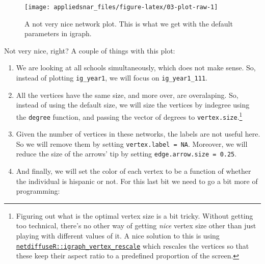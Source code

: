 \documentclass[]{book}
\newenvironment{Shaded}{\begin{snugshade}}{\end{snugshade}}
\newcommand{\KeywordTok}[1]{\textcolor[rgb]{0.13,0.29,0.53}{\textbf{#1}}}
\newcommand{\DecValTok}[1]{\textcolor[rgb]{0.00,0.00,0.81}{#1}}
\newcommand{\StringTok}[1]{\textcolor[rgb]{0.31,0.60,0.02}{#1}}
\newcommand{\OperatorTok}[1]{\textcolor[rgb]{0.81,0.36,0.00}{\textbf{#1}}}
\newcommand{\NormalTok}[1]{#1}
\let\rmarkdownfootnote\footnote%
\def\footnote{\protect\rmarkdownfootnote}
\theoremstyle{definition}
\theoremstyle{definition}
\theoremstyle{definition}
\theoremstyle{remark}
\begin{document}
\begin{figure}

{\centering \texttt{[image: appliedsnar\_files/figure-latex/03-plot-raw-1]} 

}

\caption{A not very nice network plot. This is what we get with the default parameters in igraph.}\label{fig:03-plot-raw}
\end{figure}

Not very nice, right? A couple of things with this plot:

\begin{enumerate}
\def\labelenumi{\arabic{enumi}.}
\item
  We are looking at all schools simultaneously, which does not make
  sense. So, instead of plotting \texttt{ig\_year1}, we will focus on
  \texttt{ig\_year1\_111}.
\item
  All the vertices have the same size, and more over, are overalaping.
  So, instead of using the default size, we will size the vertices by
  indegree using the \texttt{degree} function, and passing the vector of
  degrees to \texttt{vertex.size}.\footnote{Figuring out what is the
    optimal vertex size is a bit tricky. Without getting too technical,
    there's no other way of getting \emph{nice} vertex size other than
    just playing with different values of it. A nice solution to this is
    using
    \href{https://www.rdocumentation.org/packages/netdiffuseR/versions/1.17.0/topics/rescale_vertex_igraph}{\texttt{netdiffuseR::igraph\_vertex\_rescale}}
    which rescales the vertices so that these keep their aspect ratio to
    a predefined proportion of the screen.}
\item
  Given the number of vertices in these networks, the labels are not
  useful here. So we will remove them by setting
  \texttt{vertex.label\ =\ NA}. Moreover, we will reduce the size of the
  arrows' tip by setting \texttt{edge.arrow.size\ =\ 0.25}.
\item
  And finally, we will set the color of each vertex to be a function of
  whether the individual is hispanic or not. For this last bit we need
  to go a bit more of programming:
\end{enumerate}

\begin{Shaded}
\end{Shaded}
\end{document}
